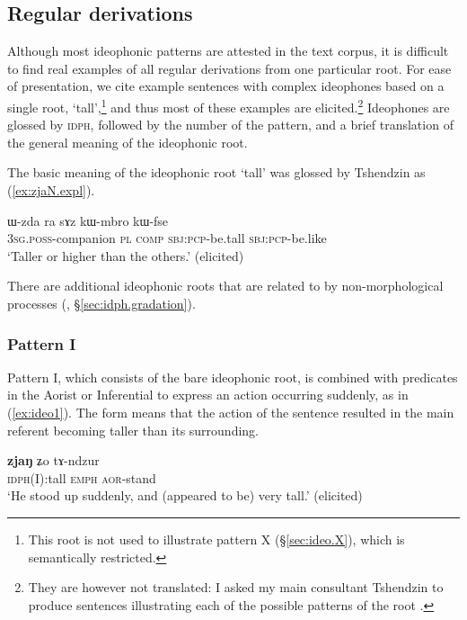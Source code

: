\subsection{Regular derivations} \label{sec:ideo.regular}
 Although most ideophonic patterns are attested in the text corpus, it is difficult to find real examples of all regular derivations from one particular root. For ease of presentation, we cite example sentences with complex ideophones based on a single root,   `tall',\footnote{This root is not used to illustrate pattern X (§\ref{sec:ideo.X}), which is semantically restricted. } and thus most of these examples are elicited.\footnote{They are however not translated: I asked my main consultant Tshendzin to produce sentences illustrating each of the possible patterns of the root . } Ideophones are glossed by \textsc{idph}, followed by the number of the pattern, and a brief translation of the general meaning of the ideophonic root.

The basic meaning of the ideophonic root   `tall' was glossed by Tshendzin as (\ref{ex:zjaN.expl}).

\begin{exe} 
\ex \label{ex:zjaN.expl}
\gll ɯ-zda ra sɤz kɯ-mbro kɯ-fse \\
\textsc{3sg}.\textsc{poss}-companion \textsc{pl} \textsc{comp} \textsc{sbj}:\textsc{pcp}-be.tall \textsc{sbj}:\textsc{pcp}-be.like \\
\glt `Taller or higher than the others.' (elicited) 
\end{exe}

There are additional ideophonic roots that are related to  by non-morphological processes (, §\ref{sec:idph.gradation}).

 \subsubsection{Pattern I} \label{sec:ideo.I}
Pattern I, which consists of the bare ideophonic root, is combined with predicates in the Aorist or Inferential to express an action occurring suddenly, as in (\ref{ex:ideo1}). The form  means that the action of the sentence resulted in the main referent becoming taller than its surrounding.

\begin{exe} 
\ex \label{ex:ideo1}
\gll \textbf{zjaŋ} ʑo tɤ-ndzur  \\
\textsc{idph}(I):tall \textsc{emph} \textsc{aor}-stand \\
\glt `He stood up suddenly, and (appeared to be) very tall.'  (elicited)
\end{exe}
 

